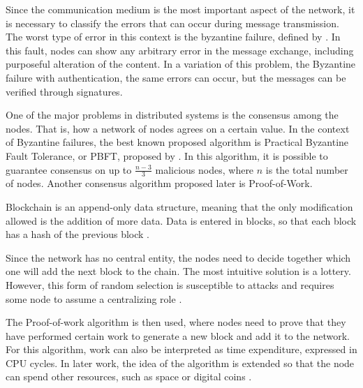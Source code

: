 \documentclass[english]{textolivre}
\begin{document}
Since the communication medium is the most important aspect of the network, it is necessary to classify the errors that can occur during message transmission. The worst type of error in this context is the byzantine failure, defined by \textcite{lamport2019byzantine}. In this fault, nodes can show any arbitrary error in the message exchange, including purposeful alteration of the content. In a variation of this problem, the Byzantine failure with authentication, the same errors can occur, but the messages can be verified through signatures.


One of the major problems in distributed systems is the consensus among the nodes. That is, how a network of nodes agrees on a certain value. In the context of Byzantine failures, the best known proposed algorithm is Practical Byzantine Fault Tolerance, or PBFT, proposed by \textcite{liskov}. In this algorithm, it is possible to guarantee consensus on up to $\frac{n-3}{3}$ malicious nodes, where $n$ is the total number of nodes. Another consensus algorithm proposed later is Proof-of-Work. %

Blockchain is an append-only data structure, meaning that the only modification allowed is the addition of more data. Data is entered in blocks, so that each block has a hash of the previous block \cite{nakamoto}.

Since the network has no central entity, the nodes need to decide together which one will add the next block to the chain. The most intuitive solution is a lottery. However, this form of random selection is susceptible to attacks and requires some node to assume a centralizing role \cite{zheng}.

The Proof-of-work algorithm \cite{dwork} is then used, where nodes need to prove that they have performed certain work to generate a new block and add it to the network. For this algorithm, work can also be interpreted as time expenditure, expressed in CPU cycles. In later work, the idea of the algorithm is extended so that the node can spend other resources, such as space or digital coins \cite{dziembowski2015proofs, gavzi2019proof}. 


\end{document}
